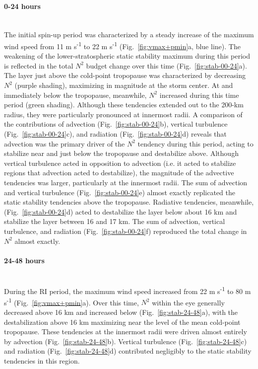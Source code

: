 \documentclass{ametsoc}
\begin{document}
\paragraph{0-24 hours}\mbox{}\\
\indent The initial spin-up period was characterized by a steady increase of the maximum wind speed from 11 m s\textsuperscript{-1} to 22 m s\textsuperscript{-1} (Fig.~\ref{fig:vmax+pmin}a, blue line).
The weakening of the lower-stratospheric static stability maximum during this period is reflected in the total $N^2$ budget change over this time (Fig.~\ref{fig:stab-00-24}a).
The layer just above the cold-point tropopause was characterized by decreasing $N^2$ (purple shading), maximizing in magnitude at the storm center.
At and immediately below the tropopause, meanwhile, $N^2$ increased during this time period (green shading).
Although these tendencies extended out to the 200-km radius, they were particularly pronounced at innermost radii.
A comparison of the contributions of advection (Fig.~\ref{fig:stab-00-24}b), vertical turbulence (Fig.~\ref{fig:stab-00-24}c), and radiation (Fig.~\ref{fig:stab-00-24}d) reveals that advection was the primary driver of the $N^2$ tendency during this period, acting to stabilize near and just below the tropopause and destabilize above.
Although vertical turbulence acted in opposition to advection (i.e. it acted to stabilize regions that advection acted to destabilize), the magnitude of the advective tendencies was larger, particularly at the innermost radii.
The sum of advection and vertical turbulence (Fig.~\ref{fig:stab-00-24}e) almost exactly replicated the static stability tendencies above the tropopause.
Radiative tendencies, meanwhile, (Fig.~\ref{fig:stab-00-24}d) acted to destabilize the layer below about 16 km and stabilize the layer between 16 and 17 km.
The sum of advection, vertical turbulence, and radiation (Fig.~\ref{fig:stab-00-24}f) reproduced the total change in $N^2$ almost exactly.

\paragraph{24-48 hours}\mbox{}\\
\indent During the RI period, the maximum wind speed increased from 22 m s\textsuperscript{-1} to 80 m s\textsuperscript{-1} (Fig.~\ref{fig:vmax+pmin}a).
Over this time, $N^2$ within the eye generally decreased above 16 km and increased below (Fig.~\ref{fig:stab-24-48}a), with the destabilization above 16 km maximizing near the level of the mean cold-point tropopause.
These tendencies at the innermost radii were driven almost entirely by advection (Fig.~\ref{fig:stab-24-48}b).
Vertical turbulence (Fig.~\ref{fig:stab-24-48}c) and radiation (Fig.~\ref{fig:stab-24-48}d) contributed negligibly to the static stability tendencies in this region.
\end{document}
